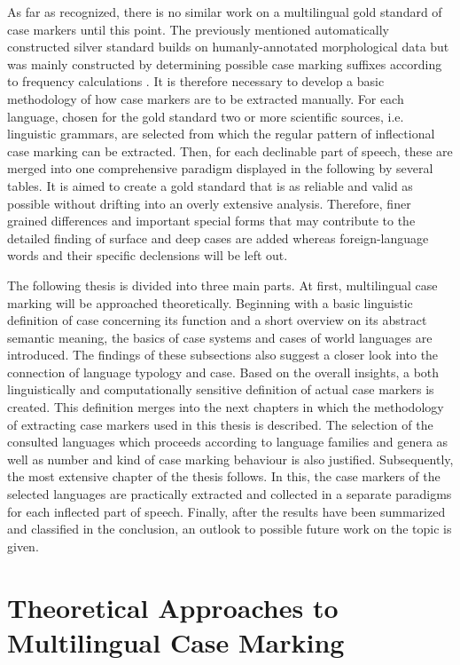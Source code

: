 \documentclass[11pt,a4paper,twoside,openright]{scrbook}
\begin{document}
As far as recognized, there is no similar work on a multilingual gold standard of case markers until this point. The previously mentioned automatically constructed silver standard builds on humanly-annotated morphological data but was mainly constructed by determining possible case marking suffixes according to frequency calculations \citep{weissweiler2022camel}. It is therefore necessary to develop a basic methodology of how case markers are to be extracted manually. For each language, chosen for the gold standard two or more scientific sources, i.e. linguistic grammars, are selected from which the regular pattern of inflectional case marking can be extracted. Then, for each declinable part of speech, these are merged into one comprehensive paradigm displayed in the following by several tables. It is aimed to create a gold standard that is as reliable and valid as possible without drifting into an overly extensive analysis. Therefore, finer grained differences and important special forms that may contribute to the detailed finding of surface and deep cases are added whereas foreign-language words and their specific declensions will be left out. 

The following thesis is divided into three main parts. At first, multilingual case marking will be approached theoretically. Beginning with a basic linguistic definition of case concerning its function and a short overview on its abstract semantic meaning, the basics of case systems and cases of world languages are introduced. The findings of these subsections also suggest a closer look into the connection of language typology and case. Based on the overall insights, a both linguistically and computationally sensitive definition of actual case markers is created. This definition merges into the next chapters in which the methodology of extracting case markers used in this thesis is described. The selection of the consulted languages which proceeds according to language families and genera as well as number and kind of case marking behaviour is also justified. Subsequently, the most extensive chapter of the thesis follows. In this, the case markers of the selected languages are practically extracted and collected in a separate paradigms for each inflected part of speech. Finally, after the results have been summarized and classified in the conclusion, an outlook to possible future work on the topic is given.






\chapter{Theoretical Approaches to Multilingual Case Marking}
\end{document}
